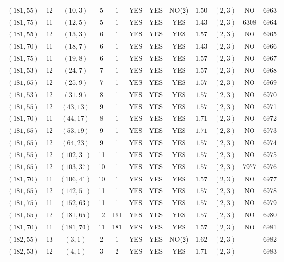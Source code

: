 \begin{longtable}{|c|c|c|c|c|c|c|c|c|c|c|c|}
$(181,55)$ & 12 & $(10,3)$ & 5 & 1 & YES & YES & NO(2) & $1.50$ & $(2,3)$ & NO & 6963\\
$(181,75)$ & 11 & $(12,5)$ & 5 & 1 & YES & YES & YES & $1.43$ & $(2,3)$ & 6308 & 6964\\
$(181,55)$ & 12 & $(13,3)$ & 6 & 1 & YES & YES & YES & $1.57$ & $(2,3)$ & NO & 6965\\
$(181,70)$ & 11 & $(18,7)$ & 6 & 1 & YES & YES & YES & $1.43$ & $(2,3)$ & NO & 6966\\
$(181,75)$ & 11 & $(19,8)$ & 6 & 1 & YES & YES & YES & $1.57$ & $(2,3)$ & NO & 6967\\
$(181,53)$ & 12 & $(24,7)$ & 7 & 1 & YES & YES & YES & $1.57$ & $(2,3)$ & NO & 6968\\
$(181,65)$ & 12 & $(25,9)$ & 7 & 1 & YES & YES & YES & $1.57$ & $(2,3)$ & NO & 6969\\
$(181,53)$ & 12 & $(31,9)$ & 8 & 1 & YES & YES & YES & $1.57$ & $(2,3)$ & NO & 6970\\
$(181,55)$ & 12 & $(43,13)$ & 9 & 1 & YES & YES & YES & $1.57$ & $(2,3)$ & NO & 6971\\
$(181,70)$ & 11 & $(44,17)$ & 8 & 1 & YES & YES & YES & $1.71$ & $(2,3)$ & NO & 6972\\
$(181,65)$ & 12 & $(53,19)$ & 9 & 1 & YES & YES & YES & $1.71$ & $(2,3)$ & NO & 6973\\
$(181,65)$ & 12 & $(64,23)$ & 9 & 1 & YES & YES & YES & $1.57$ & $(2,3)$ & NO & 6974\\
$(181,55)$ & 12 & $(102,31)$ & 11 & 1 & YES & YES & YES & $1.57$ & $(2,3)$ & NO & 6975\\
$(181,65)$ & 12 & $(103,37)$ & 10 & 1 & YES & YES & YES & $1.57$ & $(2,3)$ & 7977 & 6976\\
$(181,70)$ & 11 & $(106,41)$ & 10 & 1 & YES & YES & YES & $1.57$ & $(2,3)$ & NO & 6977\\
$(181,65)$ & 12 & $(142,51)$ & 11 & 1 & YES & YES & YES & $1.57$ & $(2,3)$ & NO & 6978\\
$(181,75)$ & 11 & $(152,63)$ & 11 & 1 & YES & YES & YES & $1.57$ & $(2,3)$ & NO & 6979\\
$(181,65)$ & 12 & $(181,65)$ & 12 & 181 & YES & YES & YES & $1.57$ & $(2,3)$ & NO & 6980\\
$(181,70)$ & 11 & $(181,70)$ & 11 & 181 & YES & YES & YES & $1.57$ & $(2,3)$ & NO & 6981\\
$(182,55)$ & 13 & $(3,1)$ & 2 & 1 & YES & YES & NO(2) & $1.62$ & $(2,3)$ & -- & 6982\\
$(182,53)$ & 12 & $(4,1)$ & 3 & 2 & YES & YES & YES & $1.71$ & $(2,3)$ & -- & 6983\\

\end{longtable}
